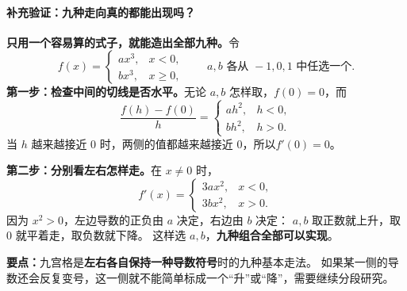 \clearpage
\begin{proofbox}
\paragraph{补充验证：九种走向真的都能出现吗？}

\textbf{只用一个容易算的式子，就能造出全部九种。}令
\[
 f(x)=
 \begin{cases}
   ax^3,&x<0,\\
   bx^3,&x\ge 0,
 \end{cases}
 \qquad a,b\text{ 各从 }-1,0,1\text{ 中任选一个}.
\]
\textbf{第一步：检查中间的切线是否水平。}无论 $a,b$ 怎样取，$f(0)=0$，而
\[
\frac{f(h)-f(0)}{h}=
\begin{cases}ah^2,&h<0,\\bh^2,&h>0.\end{cases}
\]
当 $h$ 越来越接近 $0$ 时，两侧的值都越来越接近 $0$，所以\textbf{$f'(0)=0$}。

\textbf{第二步：分别看左右怎样走。}在 $x\ne0$ 时，
\[
 f'(x)=\begin{cases}3ax^2,&x<0,\\3bx^2,&x>0.\end{cases}
\]
因为 $x^2>0$，左边导数的正负由 $a$ 决定，右边由 $b$ 决定：
$a,b$ 取正数就上升，取 $0$ 就平着走，取负数就下降。
这样选 $a,b$，\textbf{九种组合全部可以实现}。

\textbf{要点：}九宫格是\textbf{左右各自保持一种导数符号}时的九种基本走法。
如果某一侧的导数还会反复变号，这一侧就不能简单标成一个``升''或``降''，需要继续分段研究。
\end{proofbox}
